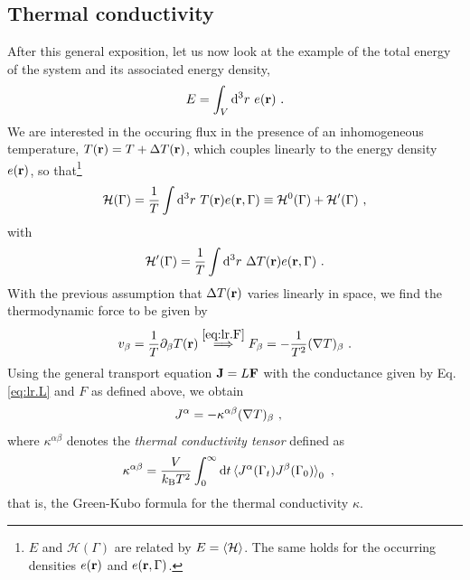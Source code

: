 \subsection{Thermal conductivity}
\label{sec:Thermal.Conductivity}
After this general exposition, let us now look at the example of the total energy of the system and its associated energy density,
\begin{align}
	E = \int_V \d^3 r ~ e(\b r)~.
	\label{eq:lr.E}
\end{align}
We are interested in the occuring flux in the presence of an inhomogeneous temperature, $T({\bf r}) = T + \Delta T({\bf r})$, which couples linearly to the energy density  $e ({\bf r})$, so that\footnote{$E$ and $\mathcal H(\Gamma)$ are related by $E = \braket{\mathcal H}$. The same holds for the occurring densities $e({\bf r})$ and $e ({\bf r}, \Gamma)$.}
\begin{align}
	\mathcal H (\Gamma) = \frac{1}{T} \int {\rm d}^3 r ~ T ({\bf r}) e({\bf r}, \Gamma) 
		\equiv \mathcal H^0 (\Gamma) + \mathcal H' (\Gamma)~,
\end{align}
with
\begin{align}
	\mathcal H' (\Gamma) = \frac{1}{T} \int \d^3 r ~ \Delta T (\b r) e(\b r, \Gamma)~.
	\label{eq:lr.Hp.temp}
\end{align}
With the previous assumption that $\Delta T({\bf r})$ varies linearly in space, we find the thermodynamic force to be given by
\begin{align}
	v_\beta = \frac{1}{T} \partial_\beta T (\b r) 
		\stackrel{\eqref{eq:lr.F}}{\implies}
	F_\beta = - \frac{1}{T^2} (\b \nabla T)_\beta ~.
	\label{eq:lr.F.temp}
\end{align}
Using the general transport equation ${\bf J} = L {\bf F}$ with the conductance given by Eq.\,\eqref{eq:lr.L} and $F$ as defined above, we obtain
\begin{align}
	J^\alpha 
		&= - \kappa^{\alpha \beta} (\b \nabla T)_\beta~,
	\label{eq:lr.J.2}
\end{align}
where $\kappa^{\alpha \beta}$ denotes the \emph{thermal conductivity tensor} defined as
\begin{align}
	\kappa^{\alpha \beta}
		&=
		\frac{V}{k_{\rm B} T^2} \int_{0}^{\infty} 
		\d t \braket{J^\alpha (\Gamma_t) J^\beta (\Gamma_{0})}_0 ~,
	\label{eq:GreenKubo}
\end{align}
that is, the Green-Kubo formula for the thermal conductivity $\kappa$.

